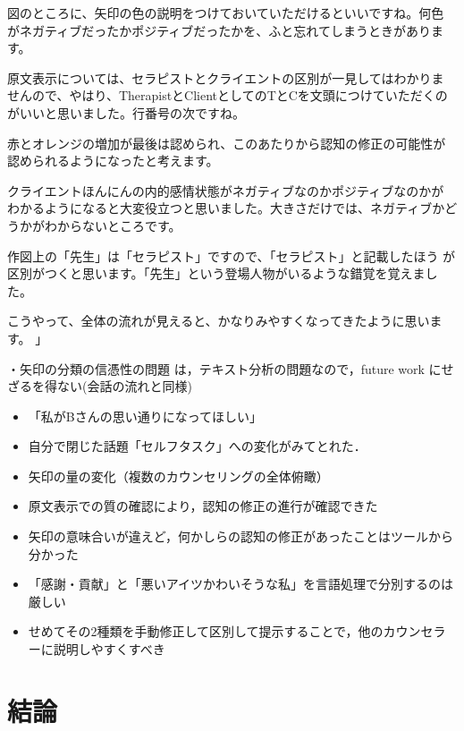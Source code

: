 \documentclass[shuuron]{kuee}
\begin{document}
図のところに、矢印の色の説明をつけておいていただけるといいですね。何色
がネガティブだったかポジティブだったかを、ふと忘れてしまうときがあります。

原文表示については、セラピストとクライエントの区別が一見してはわかりま
せんので、やはり、TherapistとClientとしてのTとCを文頭につけていただくの
がいいと思いました。行番号の次ですね。

赤とオレンジの増加が最後は認められ、このあたりから認知の修正の可能性が
認められるようになったと考えます。

クライエントほんにんの内的感情状態がネガティブなのかポジティブなのかが
わかるようになると大変役立つと思いました。大きさだけでは、ネガティブかど
うかがわからないところです。

作図上の「先生」は「セラピスト」ですので、「セラピスト」と記載したほう
が区別がつくと思います。「先生」という登場人物がいるような錯覚を覚えまし
た。

こうやって、全体の流れが見えると、かなりみやすくなってきたように思いま
す。
」

・矢印の分類の信憑性の問題
は，テキスト分析の問題なので，future work にせざるを得ない(会話の流れと同様)

\begin{itemize}

  \item 「私がBさんの思い通りになってほしい」
  \item 自分で閉じた話題「セルフタスク」への変化がみてとれた．
  \item 矢印の量の変化（複数のカウンセリングの全体俯瞰）
  \item 原文表示での質の確認により，認知の修正の進行が確認できた
\end{itemize}





\begin{itemize}

  \item 矢印の意味合いが違えど，何かしらの認知の修正があったことはツールから分かった
  \item 「感謝・貢献」と「悪いアイツかわいそうな私」を言語処理で分別するのは厳しい

  \item せめてその2種類を手動修正して区別して提示することで，他のカウンセラーに説明しやすくすべき

\end{itemize}
\chapter{結論}
\end{document}
